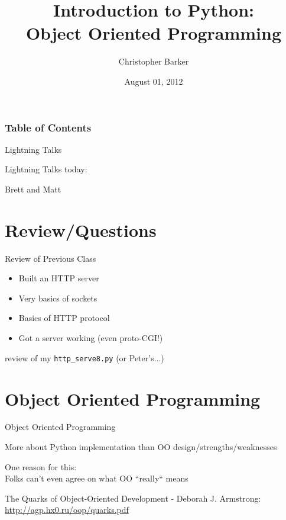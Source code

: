 \documentclass{beamer}
\title[Intro to Python: Week 6]{Introduction  to Python:\\Object Oriented Programming}
\author{Christopher Barker}
\institute{UW Continuing Education / Isilon}
\date{August 01, 2012}
\begin{document}
\begin{frame}
  \titlepage
\end{frame}

\begin{frame}
\frametitle{Table of Contents}
  \tableofcontents
\end{frame}

\begin{frame}{Lightning Talks}

{\centering

\vfill
{\LARGE Lightning Talks today:  }

\vfill
{\Huge Brett and Matt}

\vfill
}
\end{frame}


\section{Review/Questions}

\begin{frame}[fragile]{Review of Previous Class}

\begin{itemize}
  \item Built an HTTP server
  \item Very basics of sockets
  \item Basics of HTTP protocol
  \item Got a server working (even proto-CGI!)
\end{itemize}
\vfill
review of my \verb|http_serve8.py| (or Peter's...)
\end{frame}


\section{Object Oriented Programming}

\begin{frame}[fragile]{Object Oriented Programming}

\vfill
 {\Large More about Python implementation than OO design/strengths/weaknesses}

\vfill
{\Large One reason for this:\\
Folks can't even agree on what OO ``really`` means}

\vfill
The Quarks of Object-Oriented Development - Deborah J. Armstrong:\\
\url{http://agp.hx0.ru/oop/quarks.pdf}

\end{frame} 
\end{document}
